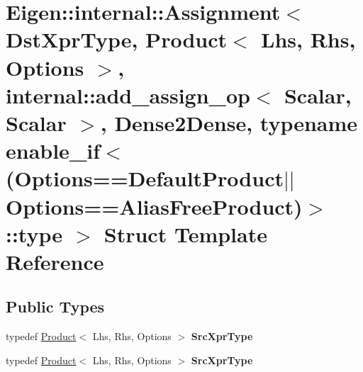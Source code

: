 \hypertarget{struct_eigen_1_1internal_1_1_assignment_3_01_dst_xpr_type_00_01_product_3_01_lhs_00_01_rhs_00_01fcb8254334c8007b54d75ff97f0106b6}{}\section{Eigen\+:\+:internal\+:\+:Assignment$<$ Dst\+Xpr\+Type, Product$<$ Lhs, Rhs, Options $>$, internal\+:\+:add\+\_\+assign\+\_\+op$<$ Scalar, Scalar $>$, Dense2\+Dense, typename enable\+\_\+if$<$(Options==Default\+Product$\vert$$\vert$\+Options==Alias\+Free\+Product)$>$\+:\+:type $>$ Struct Template Reference}
\label{struct_eigen_1_1internal_1_1_assignment_3_01_dst_xpr_type_00_01_product_3_01_lhs_00_01_rhs_00_01fcb8254334c8007b54d75ff97f0106b6}
\subsection*{Public Types}
\begin{DoxyCompactItemize}
\item 
\mbox{\label{struct_eigen_1_1internal_1_1_assignment_3_01_dst_xpr_type_00_01_product_3_01_lhs_00_01_rhs_00_01fcb8254334c8007b54d75ff97f0106b6_a718b5cb522602e984768c6c4c58801f1}} 
typedef \hyperlink{group___core___module_class_eigen_1_1_product}{Product}$<$ Lhs, Rhs, Options $>$ {\bfseries Src\+Xpr\+Type}
\item 
\mbox{\label{struct_eigen_1_1internal_1_1_assignment_3_01_dst_xpr_type_00_01_product_3_01_lhs_00_01_rhs_00_01fcb8254334c8007b54d75ff97f0106b6_a718b5cb522602e984768c6c4c58801f1}} 
typedef \hyperlink{group___core___module_class_eigen_1_1_product}{Product}$<$ Lhs, Rhs, Options $>$ {\bfseries Src\+Xpr\+Type}
\end{DoxyCompactItemize}
